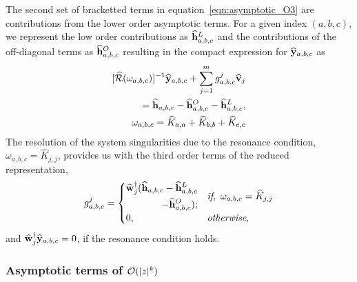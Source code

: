 The second set of bracketted terms in equation~\eqref{eqn:asymptotic_O3} are contributions from the lower order asymptotic terms. For a given index $(a,b,c)$, we represent the low order contributions as $\widehat{\mathbf{h}}^{L}_{a,b,c}$ and the contributions of the off-diagonal terms as $\widehat{\mathbf{h}}^{O}_{a,b,c}$ resulting in the compact expression for $\widehat{\mathbf{y}}_{a,b,c}$ as
\begin{subequations}
\label{eqn:asymptotic_O3_compact}
\begin{align}
	\begin{aligned}
		\ResolventHat{\omega_{a,b,c}}^{-1}\AsECenM_{a,b,c}  + \sum^{m}_{j=1}\AsParamEl^{j}_{a,b,c}\EDevec_{j} \\ 
		 = \AsEForcing_{a,b,c} - \AsEForcingO_{a,b,c} - \AsEForcingL_{a,b,c},
	\end{aligned}\\
	\omega_{a,b,c} = \widehat{K}_{a,a} + \widehat{K}_{b,b} + \widehat{K}_{c,c}
\end{align}
\end{subequations}
The resolution of the system singularities due to the resonance condition, $\omega_{a,b,c} = \widehat{K}_{j,j}$, provides us with the third order terms of the reduced representation,
\begin{equation}
	\label{eqn:g3_definition}
	g^{j}_{a,b,c} =
	\begin{cases}
		\begin{split}
			\widehat{\mathbf{w}}_{j}^{\dagger}(\widehat{\mathbf{h}}_{a,b,c} - \widehat{\mathbf{h}}^{L}_{a,b,c}\\
			 - \widehat{\mathbf{h}}^{O}_{a,b,c});
		\end{split}
		 & \begin{split}
			\textit{if},\ \omega_{a,b,c} = \widehat{K}_{j,j}
		\end{split} \\
		0,														& \textit{otherwise},
	\end{cases}
\end{equation}
and $\widehat{\mathbf{w}}^{\dagger}_{j}\widehat{\mathbf{y}}_{a,b,c} = 0$, if the resonance condition holds. 

\subsubsection{Asymptotic terms of $\mathcal{O}(|z|^{k})$}
\label{sec:normal_form_Ok}

